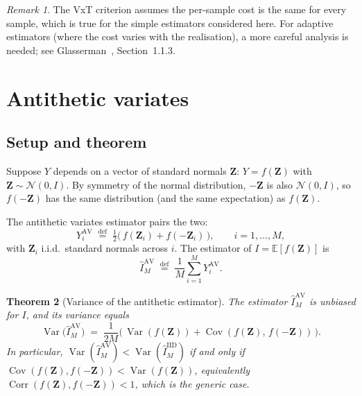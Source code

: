 \documentclass[11pt,a4paper]{article}
\theoremstyle{plain}
\newtheorem{theorem}{Theorem}[section]
\theoremstyle{definition}
\theoremstyle{remark}
\newtheorem{remark}[theorem]{Remark}
\newcommand{\E}{\mathbb{E}}
\newcommand{\Var}{\operatorname{Var}}
\newcommand{\Cov}{\operatorname{Cov}}
\newcommand{\Corr}{\operatorname{Corr}}
\newcommand{\eqdef}{\overset{\mathrm{def}}{=}}
\begin{document}
\begin{remark}
The VxT criterion assumes the per-sample cost is the same for every
sample, which is true for the simple estimators considered here. For
adaptive estimators (where the cost varies with the realisation), a
more careful analysis is needed; see Glasserman~\cite{Glasserman},
Section~1.1.3.
\end{remark}

\section{Antithetic variates}
\label{sec:av}

\subsection{Setup and theorem}

Suppose $Y$ depends on a vector of standard normals $\mathbf{Z}$:
$Y = f(\mathbf{Z})$ with $\mathbf{Z} \sim \mathcal{N}(0, I)$. By
symmetry of the normal distribution, $-\mathbf{Z}$ is also
$\mathcal{N}(0, I)$, so $f(-\mathbf{Z})$ has the same distribution
(and the same expectation) as $f(\mathbf{Z})$.

The antithetic variates estimator pairs the two:
\begin{equation}
\label{eq:av-Yi}
Y_i^{\mathrm{AV}} \;\eqdef\; \tfrac{1}{2}\bigl(\,f(\mathbf{Z}_i) + f(-\mathbf{Z}_i)\,\bigr),
\qquad i = 1, \ldots, M,
\end{equation}
with $\mathbf{Z}_i$ i.i.d.\ standard normals across $i$. The estimator
of $I = \E[f(\mathbf{Z})]$ is
\begin{equation}
\hat I_M^{\mathrm{AV}} \;\eqdef\; \frac{1}{M} \sum_{i=1}^M Y_i^{\mathrm{AV}}.
\end{equation}

\begin{theorem}[Variance of the antithetic estimator]
\label{thm:av}
The estimator $\hat I_M^{\mathrm{AV}}$ is unbiased for $I$, and its
variance equals
\begin{equation}
\label{eq:av-variance}
\Var\bigl(\hat I_M^{\mathrm{AV}}\bigr)
\;=\; \frac{1}{2M} \bigl(\,\Var(f(\mathbf{Z})) + \Cov(f(\mathbf{Z}),\, f(-\mathbf{Z}))\,\bigr).
\end{equation}
In particular, $\Var(\hat I_M^{\mathrm{AV}}) < \Var(\hat I_M^{\mathrm{IID}})$
if and only if $\Cov(f(\mathbf{Z}), f(-\mathbf{Z})) <
\Var(f(\mathbf{Z}))$, equivalently $\Corr(f(\mathbf{Z}), f(-\mathbf{Z}))
< 1$, which is the generic case.
\end{theorem}
\end{document}
